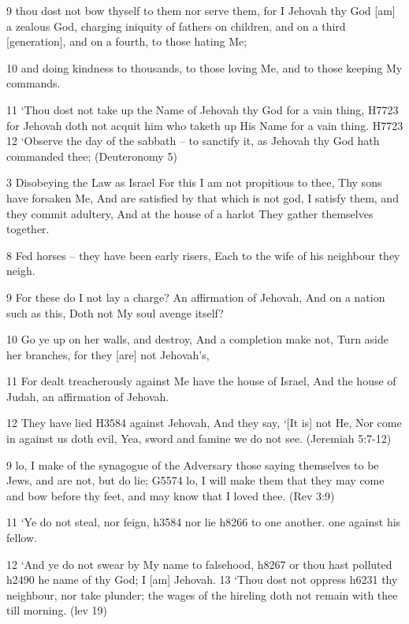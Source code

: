 \documentclass[11pt]{article}
\begin{document}
9 thou dost not bow thyself to them nor serve them, for I Jehovah thy God [am] a zealous God, charging iniquity of fathers on children, and on a third [generation], and on a fourth, to those hating Me;

10 and doing kindness to thousands, to those loving Me, and to those keeping My commands.


11 `Thou dost not take up the Name of Jehovah thy God for a vain thing,  H7723 for Jehovah doth not acquit him who taketh up His Name for a vain thing. H7723
12 `Observe the day of the sabbath -- to sanctify it, as Jehovah thy God hath commanded thee;
(Deuteronomy 5)\newline

{\Large 3 Disobeying the Law as Israel} For this I am not propitious to thee, Thy sons have forsaken Me, And are satisfied by that which is not god, I satisfy them, and they commit adultery, And at the house of a harlot They gather themselves together.

8 Fed horses -- they have been early risers, Each to the wife of his neighbour they neigh.

9 For these do I not lay a charge? An affirmation of Jehovah, And on a nation such as this, Doth not My soul avenge itself?

10 Go ye up on her walls, and destroy, And a completion make not, Turn aside her branches, for they [are] not Jehovah's,

11 For dealt treacherously against Me have the house of Israel, And the house of Judah, an affirmation of Jehovah.

12 They have lied H3584 against Jehovah, And they say, `[It is] not He, Nor come in against us doth evil, Yea, sword and famine we do not see.
(Jeremiah 5:7-12)\newline


9 lo, I make of the synagogue of the Adversary those saying themselves to be Jews, and are not, but do lie; G5574 lo, I will make them that they may come and bow before thy feet, and may know that I loved thee.
(Rev 3:9)\newline

11 `Ye do not steal, nor feign, h3584 nor lie h8266 to one another. one against his fellow.

12 `And ye do not swear by My name to falsehood,	h8267 or thou hast polluted  h2490 he name of thy God; I [am] Jehovah. 13  `Thou dost not oppress  h6231 thy neighbour, nor take plunder; the wages of the hireling doth not remain with thee till morning.
(lev 19)\newline
\end{document}
